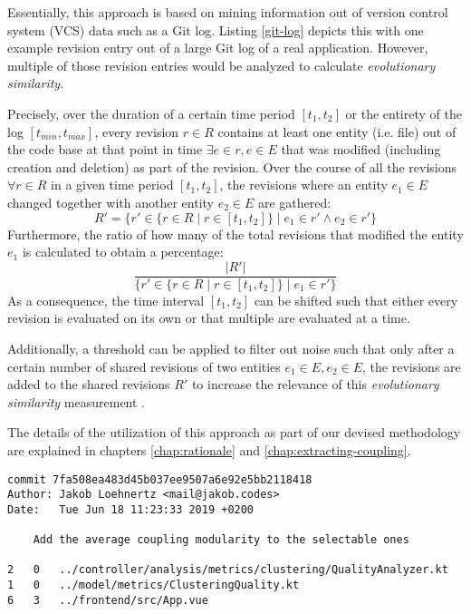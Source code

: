 \documentclass[12pt,a4paper]{report}
\begin{document}
Essentially, this approach is based on mining information out of version
control system (VCS) data such as a Git log. Listing \ref{git-log} depicts
this with one example revision entry out of a large Git log of a real
application. However, multiple of those revision entries would be analyzed to
calculate \textit{evolutionary similarity}.

Precisely, over the duration of a certain time period \([t_1, t_2]\) or the
entirety of the log \([t_{min}, t_{max}]\), every revision \(r \in R\) contains
at least one entity (i.e. file) out of the code base at that point in time \(
\exists e \in r, e \in E\) that was modified (including creation and deletion)
as part of the revision. Over the course of all the revisions \(\forall r \in
R\) in a given time period \([t_1, t_2]\), the revisions where an entity \(e_1
\in E\) changed together with another entity \(e_2 \in E\) are gathered:
\[
  R' = \{ r' \in \{ r \in R \mid r \in [t_1, t_2] \} \mid e_1 \in r' \land e_2 \in r' \}
\]
Furthermore, the ratio of how many of the total revisions that
modified the entity \(e_1\) is calculated to obtain a percentage:
\[
  \frac{\vert R' \vert}{\{ r' \in \{ r \in R \mid r \in [t_1, t_2] \} \mid e_1 \in r' \}}
\]
As a consequence, the time interval \([t_1, t_2]\) can be shifted such
that either every revision is evaluated on its own or that multiple are
evaluated at a time.

Additionally, a threshold can be applied to filter out noise such that only
after a certain number of shared revisions of two entities \(e_1 \in E, e_2 \in
E\), the revisions are added to the shared revisions \(R'\) to increase the
relevance of this \textit{evolutionary similarity} measurement
\cite{tornhill2015crimescene}.

The details of the utilization of this approach as part of our devised
methodology are explained in chapters \ref{chap:rationale} and
\ref{chap:extracting-coupling}.

\begin{lstlisting}[caption=Example Git log, label=git-log, breaklines=true]
commit 7fa508ea483d45b037ee9507a6e92e5bb2118418
Author: Jakob Loehnertz <mail@jakob.codes>
Date:   Tue Jun 18 11:23:33 2019 +0200

    Add the average coupling modularity to the selectable ones

2   0   ../controller/analysis/metrics/clustering/QualityAnalyzer.kt
1   0   ../model/metrics/ClusteringQuality.kt
6   3   ../frontend/src/App.vue
\end{lstlisting}
\end{document}
